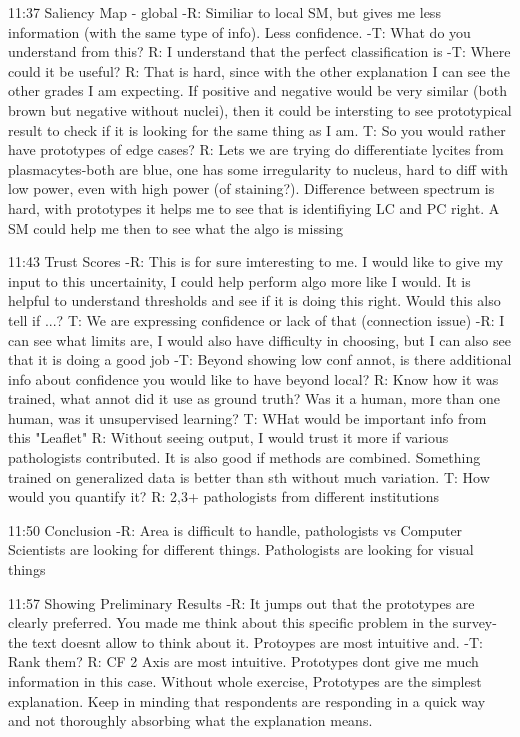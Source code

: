 11:37 Saliency Map - global
-R: Similiar to local SM, but gives me less information (with the same type of info). Less confidence.
-T: What do you understand from this? R: I understand that the perfect classification is 
-T: Where could it be useful? R: That is hard, since with the other explanation I can see the other grades I am expecting. If positive and negative would be very similar (both brown but negative without nuclei), then it could be intersting to see prototypical result to check if it is looking for the same thing as I am. T: So you would rather have prototypes of edge cases? R: Lets we are trying do differentiate lycites from plasmacytes-both are blue, one has some irregularity to nucleus, hard to diff with low power, even with high power (of staining?). Difference between spectrum is hard, with prototypes it helps me to see that is identifiying LC and PC right. A SM could help me then to see what the algo is missing

11:43 Trust Scores
-R: This is for sure imteresting to me. I would like to give my input to this uncertainity, I could help perform algo more like I would. It is helpful to understand thresholds and see if it is doing this right. Would this also tell if ...? T: We are expressing confidence or lack of that
(connection issue)
-R: I can see what limits are, I would also have difficulty in choosing, but I can also see that it is doing a good job
-T: Beyond showing low conf annot, is there additional info about confidence you would like to have beyond local? R: Know how it was trained, what annot did it use as ground truth? Was it a human, more than one human, was it unsupervised learning? T: WHat would be important info from this "Leaflet" R: Without seeing output, I would trust it more if various pathologists contributed. It is also good if methods are combined. Something trained on generalized data is better than sth without much variation. T: How would you quantify it? R: 2,3+ pathologists from different institutions

11:50 Conclusion
-R: Area is difficult to handle, pathologists vs Computer Scientists are looking for different things. Pathologists are looking for visual things

11:57 Showing Preliminary Results
-R: It jumps out that the prototypes are clearly preferred. You made me think about this specific problem in the survey- the text doesnt allow to think about it. Protoypes are most intuitive and. 
-T: Rank them? R: CF 2 Axis are most intuitive. Prototypes dont give me much information in this case. Without whole exercise, Prototypes are the simplest explanation. Keep in minding that respondents are responding in a quick way and not thoroughly absorbing what the explanation means.

